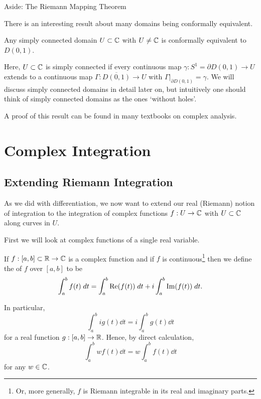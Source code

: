 \documentclass[a4paper]{scrartcl}
\begin{document}
\begin{aside}{Aside: The Riemann Mapping Theorem}

    There is an interesting result about many domains being conformally equivalent.
    
    \begin{theorem}        
        Any simply connected domain $U \subset \mathbb{C}$ with $U \neq \mathbb{C}$ is conformally equivalent to $D(0, 1)$.
    \end{theorem}

    Here, $U \subset \mathbb{C}$ is simply connected if every continuous map $\gamma: S^1 = \partial D(0, 1) \rightarrow U$ extends to a continuous map $\Gamma: \overline{D(0, 1)} \rightarrow U$ with $\left.\Gamma\right|_{\partial D(0, 1)} = \gamma$.
    We will discuss simply connected domains in detail later on, but intuitively one should think of simply connected domains as the ones `without holes'.
    
    A proof of this result can be found in many textbooks on complex analysis.

\end{aside}

\section{Complex Integration}

\subsection{Extending Riemann Integration}

As we did with differentiation, we now want to extend our real (Riemann) notion of integration to the integration of complex functions $f: U \rightarrow \mathbb{C}$ with $U \subset \mathbb{C}$ along curves in $U$.

First we will look at complex functions of a single real variable.

\begin{definition}
    If $f: [a, b] \subset \mathbb{R} \rightarrow \mathbb{C}$ is a complex function and if $f$ is continuous\footnote{Or, more generally, $f$ is Riemann integrable in its real and imaginary parts.} then we define the  of $f$ over $[a, b]$ to be
    $$
    \int_a^b f(t) \; d t = \int_a^b \operatorname{Re}(f(t)) \; d t + i \int_a^b \operatorname{Im}(f(t)) \; d t.
    $$
\end{definition}

In particular,
    $$
    \int_a^b i g(t) \dd t = i \int_a^b g(t) \dd t
    $$
    for a real function $g: [a, b] \rightarrow \mathbb{R}$. Hence, by direct calculation,
    $$
\int_a^b w f(t) \dd t = w \int_a^b f(t) \dd t
    $$
    for any $w \in \mathbb{C}$.
\end{document}
